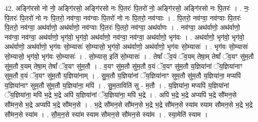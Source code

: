 \documentclass[17pt]{extarticle}
\begin{document}
42. अङ्गि॑रसो नो नो॒ अङ्गि॑रसो॒ अङ्गि॑रसो नः पि॒तरः॑ पि॒तरो॑ नो॒ अङ्गि॑रसो॒ अङ्गि॑रसो नः पि॒तरः॑ । . नः॒ पि॒तरः॑ पि॒तरो॑ नो नः पि॒तरो॒ नव॑ग्वा॒ नव॑ग्वाः पि॒तरो॑ नो नः पि॒तरो॒ नव॑ग्वाः । . पि॒तरो॒ नव॑ग्वा॒ नव॑ग्वाः पि॒तरः॑ पि॒तरो॒ नव॑ग्वा॒ अथ॑र्वाणो॒ अथ॑र्वाणो॒ नव॑ग्वाः पि॒तरः॑ पि॒तरो॒ नव॑ग्वा॒ अथ॑र्वाणः । . नव॑ग्वा॒ अथ॑र्वाणो॒ अथ॑र्वाणो॒ नव॑ग्वा॒ नव॑ग्वा॒ अथ॑र्वाणो॒ भृग॑वो॒ भृग॑वो॒ अथ॑र्वाणो॒ नव॑ग्वा॒ नव॑ग्वा॒ अथ॑र्वाणो॒ भृग॑वः । . अथ॑र्वाणो॒ भृग॑वो॒ भृग॑वो॒ अथ॑र्वाणो॒ अथ॑र्वाणो॒ भृग॑वः सो॒म्यासः॑ सो॒म्यासो॒ भृग॑वो॒ अथ॑र्वाणो॒ अथ॑र्वाणो॒ भृग॑वः सो॒म्यासः॑ । . भृग॑वः सो॒म्यासः॑ सो॒म्यासो॒ भृग॑वो॒ भृग॑वः सो॒म्यासः॑ । . सो॒म्यास॒ इति॑ सो॒म्यासः॑ । . तेषां᳚ ॅव॒यं ॅव॒यम् तेषा॒म् तेषां᳚ ॅव॒यꣳ सु॑म॒तौ सु॑म॒तौ व॒यम् तेषा॒म् तेषां᳚ ॅव॒यꣳ सु॑म॒तौ । . व॒यꣳ सु॑म॒तौ सु॑म॒तौ व॒यं ॅव॒यꣳ सु॑म॒तौ य॒ज्ञिया॑नां ॅय॒ज्ञिया॑नाꣳ सुम॒तौ व॒यं ॅव॒यꣳ सु॑म॒तौ य॒ज्ञिया॑नाम् । . सु॒म॒तौ य॒ज्ञिया॑नां ॅय॒ज्ञिया॑नाꣳ सुम॒तौ सु॑म॒तौ य॒ज्ञिया॑ना॒ मप्यपि॑ य॒ज्ञिया॑नाꣳ सुम॒तौ सु॑म॒तौ य॒ज्ञिया॑ना॒ मपि॑ । . सु॒म॒ताविति॑ सु - म॒तौ । . य॒ज्ञिया॑ना॒ मप्यपि॑ य॒ज्ञिया॑नां ॅय॒ज्ञिया॑ना॒ मपि॑ भ॒द्रे भ॒द्रे अपि॑ य॒ज्ञिया॑नां ॅय॒ज्ञिया॑ना॒ मपि॑ भ॒द्रे । . अपि॑ भ॒द्रे भ॒द्रे अप्यपि॑ भ॒द्रे सौ॑मन॒से सौ॑मन॒से भ॒द्रे अप्यपि॑ भ॒द्रे सौ॑मन॒से । . भ॒द्रे सौ॑मन॒से सौ॑मन॒से भ॒द्रे भ॒द्रे सौ॑मन॒से स्या॑म स्याम सौमन॒से भ॒द्रे भ॒द्रे सौ॑मन॒से स्या॑म । . सौ॒म॒न॒से स्या॑म स्याम सौमन॒से सौ॑मन॒से स्या॑म । . स्या॒मेति॑ स्याम । \newline
\pagebreak
\end{document}
